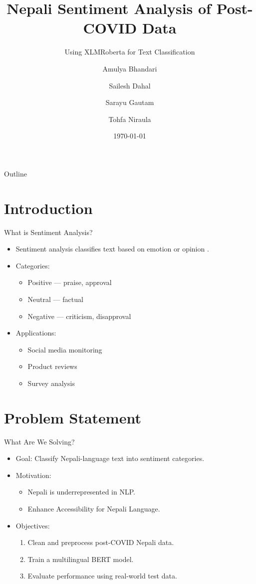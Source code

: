 \documentclass[aspectratio=169]{beamer}
\title{Nepali Sentiment Analysis of Post-COVID Data}
\subtitle{Using XLMRoberta for Text Classification}
\author{Amulya Bhandari \and Sailesh Dahal \and Sarayu Gautam \and Tohfa Niraula}
\institute{Department of Computer Engineering\\Kathmandu University}
\date{\today}
\begin{document}
\maketitle

\begin{frame}{Outline}
  \tableofcontents
\end{frame}

\section{Introduction}
\begin{frame}{What is Sentiment Analysis?}
  \begin{itemize}
    \item Sentiment analysis classifies text based on emotion or opinion \parencite{article}.
    \item Categories:
          \begin{itemize}
            \item Positive — praise, approval
            \item Neutral — factual
            \item Negative — criticism, disapproval
          \end{itemize}
    \item Applications:
          \begin{itemize}
            \item Social media monitoring
            \item Product reviews
            \item Survey analysis
          \end{itemize}
  \end{itemize}
\end{frame}

\section{Problem Statement}
\begin{frame}{What Are We Solving?}
  \begin{itemize}
    \item Goal: Classify Nepali-language text into sentiment categories.
    \item Motivation:
          \begin{itemize}
            \item Nepali is underrepresented in NLP.
            \item Enhance Accessibility for Nepali Language.
          \end{itemize}
    \item Objectives:
          \begin{enumerate}
            \item Clean and preprocess post-COVID Nepali data.
            \item Train a multilingual BERT model.
            \item Evaluate performance using real-world test data.
          \end{enumerate}
  \end{itemize}
\end{frame}
\end{document}
